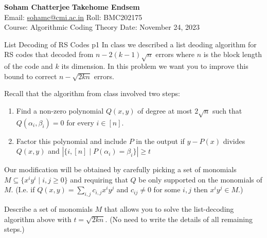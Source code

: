 \documentclass[a4paper, 11pt]{article}
\begin{document}

\textsf{\noindent \large\textbf{Soham Chatterjee} \hfill \textbf{Takehome Endsem}\\
    Email: \href{sohamc@cmi.ac.in}{sohamc@cmi.ac.in} \hfill Roll: BMC202175\\
    \normalsize Course: Algorithmic Coding Theory \hfill Date: November 24, 2023}


\begin{problem}{%
	List Decoding of RS Codes	
}{p1
}
In class we described a list deoding algorithm for RS codes that decoded from $n-2(k-1)\sqrt{n}$ errors where $n$ is the block length of the code and $k$ its dimension. In this problem we want you to improve this bound to correct $n-\sqrt{2kn}$ errors.

Recall that the algorithm from class involved two steps:\begin{enumerate}[label=(\arabic*)]
	\item Find a non-zero polynomial $Q(x,y)$ of degree at most $2\sqrt{n}$ such that $Q(\alpha_i,\beta_i)=0$ for every $i\in [n]$.
	\item Factor this polynomial and include $P$ in the output if $y-P(x)$ divides $Q(x,y)$ and $|\{i,[n]\mid P(\alpha_i)=\beta_i\}|\geq t$
\end{enumerate}
Our modification will be obtained by carefully picking a set of monomials $M\subseteq \{x^iy^i\mid i,j\geq 0\}$ and requiring that $Q$ be only supported on the monomials of $M$. (I.e. if $Q(x,y)=\sum\limits_{i,j}c_{i,j}x^iy^j$ and $c_{ij}\neq 0$ for some $i,j$ then $x^iy^j\in M$.)

Describe a set of monomials $M$ that allows you to solve the list-decoding algorithm above with $t=\sqrt{2kn}$. (No need to write the details of all remaining steps.)
\end{problem}

\solve{

}


\end{document}
